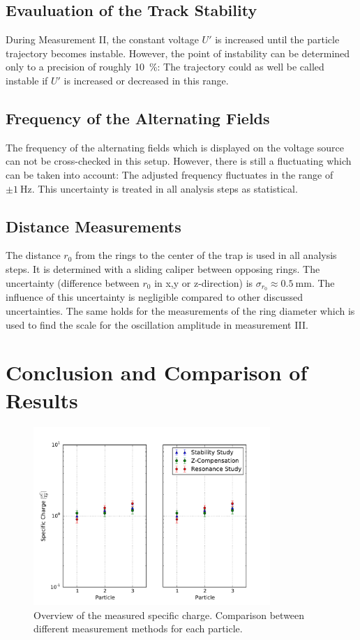 \documentclass[
	paper=A4,
	parskip=full,
	chapterprefix=true,
	11pt,
	headings=normal,
	bibliography=totoc,
	listof=totoc,
	titlepage=on,
]{scrreprt}
\begin{document}
\section{Evauluation of the Track Stability}
During Measurement II, the constant voltage $U'$ is increased until the particle trajectory becomes instable. However, the point of instability can be determined only to a precision of roughly \SI{10}{\percent}: The trajectory could as well be called instable if $U'$ is increased or decreased in this range. 
 
\section{Frequency of the Alternating Fields}
The frequency of the alternating fields which is displayed on the voltage source can not be cross-checked in this setup. However, there is still a fluctuating which can be taken into account: The adjusted frequency fluctuates in the range of $\pm \SI{1}{\hertz}$. This uncertainty is treated in all analysis steps as statistical. 

\section{Distance Measurements}
The distance $r_0$ from the rings to the center of the trap is used in all analysis steps. It is determined with a sliding caliper between opposing rings. The uncertainty (difference between $r_0$ in x,y or z-direction) is $\sigma_{r_0} \approx \SI{0.5}{\milli \meter}$. The influence of this uncertainty is negligible compared to other discussed uncertainties. The same holds for the measurements of the ring diameter which is used to find the scale for the oscillation amplitude in measurement III.

\chapter{Conclusion and Comparison of Results}


\begin{figure}[t]
	\centering
	\includegraphics[width=0.8\textwidth]{paul_compareresults}
	\caption{Overview of the measured specific charge. Comparison between different measurement methods for each particle.}
	\label{fig:comp_results}
\end{figure}	

\cleardoublepage


{}
\end{document}
